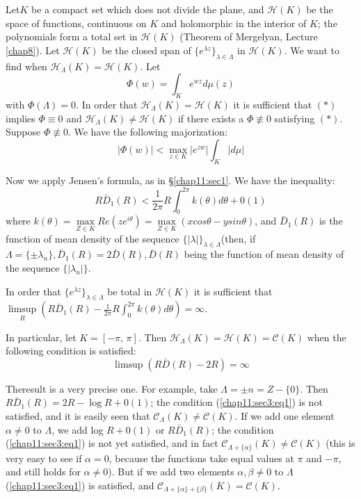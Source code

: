 Let\pageoriginale $K$ be a compact set which does not divide the plane, and
$\mathscr{H}(K)$ be the space of functions, continuous on $K$ and
holomorphic in the interior of $K$; the polynomials form a total set
in $\mathscr{H}(K)$ (Theorem of Mergelyan, Lecture \ref{chap8}). Let
$\mathscr{H}(K)$ be the closed span of $\{ e^{\lambda z}\}_{\lambda
 \in \Lambda}$ in $\mathscr{H}(K)$. We want to find when
$\mathscr{H}_{\Lambda}(K) = \mathscr{H}(K)$. Let 
\begin{equation}
 \Phi (w) = \int_K e^{wz} d \mu (z) \tag{*}
\end{equation}
with $\Phi(\Lambda) = 0$. In order that $\mathscr{H}_{\Lambda}(K) =
\mathscr{H}(K)$ it is sufficient that $(*)$ implies $\Phi \equiv 0$
and $\mathscr{H}_{\Lambda}(K) \neq \mathscr{H}(K)$ if there exists a
$\Phi \nequiv 0$ satisfying $(*)$. Suppose $\Phi \nequiv 0$. We have the
following majorization: 
$$
|\Phi(w)| <\max_{z \in K}| e^{zw}| \int_K |d \mu|
$$

Now we apply Jensen's formula, as in \S \ref{chap11:sec1}. We have the inequality:
$$
R \bar{D}_1 (R) < \frac{1}{2 \pi} R \int^{2 \pi}_{0} k(\theta) d \theta + 0(1)
$$
where $k(\theta) = \max\limits_{Z \in K} Re(z e^{i \theta} ) =
\max\limits_{Z \in K} (x cos \theta - y sin \theta )$, and $\bar{D}_1
(R)$ is the function of mean density of the sequence $\{| \lambda|
\}_{\lambda \in \Lambda}$(then, if $\Lambda = \{ \pm \lambda_n \},
\bar{D}_1 (R) = 2 \bar{D}(R), \bar{D}(R)$ being the function of mean
density of the sequence $\{ | \lambda_n |\}$. 

\begin{theorem*}%
 In order that $\{ e^{\lambda z}\}_{\lambda \in \Lambda}$ be total in
 $\mathscr{H}(K)$ it is sufficient that $\limsup\limits_R (R
 \bar{D}_1 (R) - \frac{1}{2 \pi} R \int^{2 \pi}_{0} k (\theta)
 d\theta ) = \infty$. 
\end{theorem*}

In particular, let $K = [- \pi, \,\pi ]$. Then $\mathscr{H}_{\Lambda}(K)
= \mathscr{H}(K) = \mathscr{C}(K)$ when the following condition is
satisfied: 
\begin{equation}
 \limsup (R \bar{D}(R) - 2 R) = \infty \tag{1}\label{chap11:sec3:eq1}
\end{equation}

The\pageoriginale result is a very precise one. For example, take $\Lambda = \pm n =
Z - \{ 0\}$. Then $R \bar{D}_1 (R) = 2R - \log R + 0(1)$; the
condition (\ref{chap11:sec3:eq1}) is not satisfied, and it is easily seen that
$\mathscr{C}_{\Lambda}(K) \neq \mathscr{C}(K)$. If we add one element
$\alpha \neq 0$ to $\Lambda$, we add log $R + 0(1)$ or $R
\bar{D}_1(R)$; the condition (\ref{chap11:sec3:eq1}) is not yet satisfied, and in fact
$\mathscr{C}_{\Lambda + \{ \alpha \}} (K) \neq \mathscr{C}(K)$ (this
is very easy to see if $\alpha = 0$, because the functions take equal
values at $\pi$ and $- \pi$, and still holds for $\alpha \neq 0$). But
if we add two elements $\alpha, \beta \neq 0$ to $\Lambda$
(\ref{chap11:sec3:eq1}) is
satisfied, and $\mathscr{C}_{\Lambda + \{\alpha \} + \{ \beta\}}(K) =
\mathscr{C}(K)$. 

